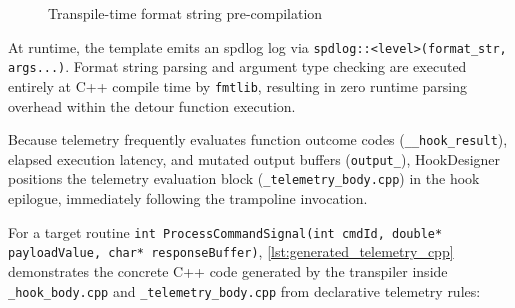 \begin{figure}[H]
	\caption{Transpile-time format string pre-compilation}
	\label{fig:expr_translation_pipeline}
\end{figure}

At runtime, the template emits an spdlog log via \texttt{spdlog::<level>(format\_str, args...)}.
Format string parsing and argument type checking are executed entirely at C++ compile time by \texttt{fmtlib}, resulting in zero runtime parsing overhead within the detour function execution.

Because telemetry frequently evaluates function outcome codes (\texttt{\_\_hook\_result}), elapsed execution latency, and mutated output buffers (\texttt{output\_}), HookDesigner positions the telemetry evaluation block (\texttt{\_telemetry\_body.cpp}) in the hook epilogue, immediately following the trampoline invocation.


For a target routine \texttt{int ProcessCommandSignal(int cmdId, double* payloadValue, char* responseBuffer)}, \cref{lst:generated_telemetry_cpp} demonstrates the concrete C++ code generated by the transpiler inside \texttt{\_hook\_body.cpp} and \texttt{\_telemetry\_body.cpp} from declarative telemetry rules:

